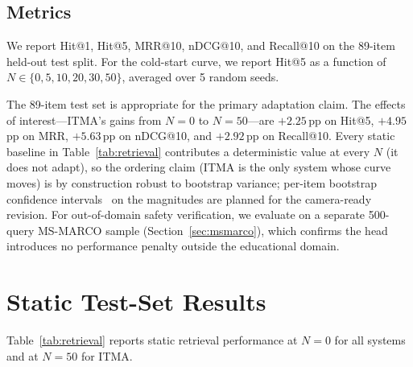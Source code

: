 \documentclass[journal]{IEEEtran}
\begin{document}
\subsection{Metrics}
We report Hit@1, Hit@5, MRR@10, nDCG@10, and Recall@10 on the 89-item
held-out test split.  For the cold-start curve, we report Hit@5 as a
function of $N\in\{0,5,10,20,30,50\}$, averaged over 5 random seeds.

The 89-item test set is appropriate for the primary adaptation claim.
The effects of interest---ITMA's gains from $N{=}0$ to $N{=}50$---are
$+2.25$\,pp on Hit@5, $+4.95$\,pp on MRR, $+5.63$\,pp on nDCG@10, and
$+2.92$\,pp on Recall@10.  Every static baseline in
Table~\ref{tab:retrieval} contributes a deterministic value at every
$N$ (it does not adapt), so the ordering claim (ITMA is the only system
whose curve moves) is by construction robust to bootstrap variance;
per-item bootstrap confidence intervals~\cite{efron1993bootstrap} on
the magnitudes are planned for the camera-ready revision.  For
out-of-domain safety verification, we evaluate on a separate 500-query
MS-MARCO sample (Section~\ref{sec:msmarco}), which confirms the head
introduces no performance penalty outside the educational domain.

\section{Static Test-Set Results}
\label{sec:static}

Table~\ref{tab:retrieval} reports static retrieval performance at
$N{=}0$ for all systems and at $N{=}50$ for ITMA.
\end{document}
